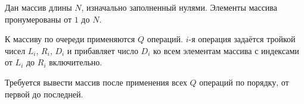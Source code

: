 Дан массив длины $N$, изначально заполненный нулями. Элементы массива пронумерованы от $1$ до $N$.

К массиву по очереди применяются $Q$ операций. $i$-я операция задаётся тройкой чисел $L_i$, $R_i$, $D_i$ и прибавляет число $D_i$ ко всем элементам массива с индексами от $L_i$ до $R_i$ включительно.

Требуется вывести массив после применения всех $Q$ операций по порядку, от первой до последней.
